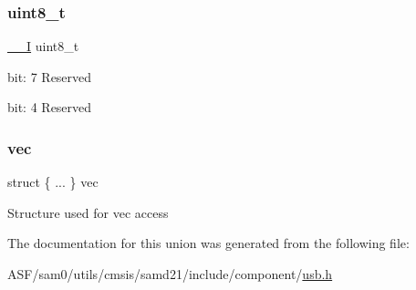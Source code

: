 \subsubsection{\texorpdfstring{uint8\_t}{uint8\_t}}
{\footnotesize\ttfamily \mbox{\hyperlink{core__cm0plus_8h_af63697ed9952cc71e1225efe205f6cd3}{\+\_\+\+\_\+I}} uint8\+\_\+t}

bit\+: 7 Reserved

bit\+: 4 Reserved \mbox{\label{union_u_s_b___d_e_v_i_c_e___e_p_i_n_t_f_l_a_g___type_addda70be6ec13c919ab333e449aca8e3}} 
\subsubsection{\texorpdfstring{vec}{vec}}
{\footnotesize\ttfamily struct \{ ... \}   vec}

Structure used for vec access 

The documentation for this union was generated from the following file\+:\begin{DoxyCompactItemize}
\item 
A\+S\+F/sam0/utils/cmsis/samd21/include/component/\mbox{\hyperlink{component_2usb_8h}{usb.\+h}}\end{DoxyCompactItemize}
